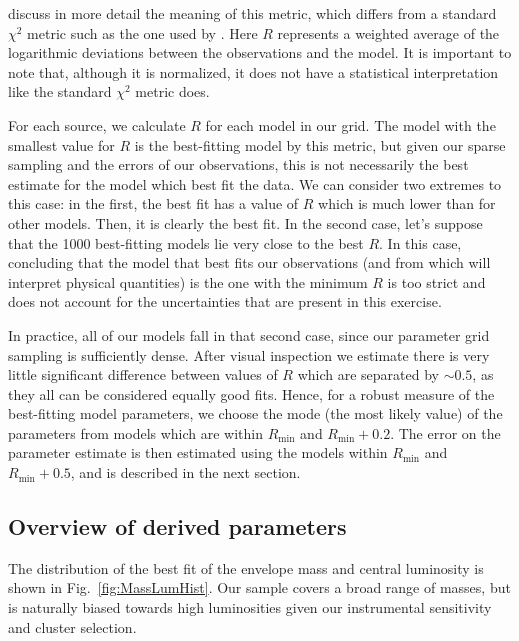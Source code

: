 \citet{Furlan:2016df} discuss in more detail the meaning of this metric, which differs from a standard $\chi^2$ metric such as the one used by \citet{Robitaille:2007dl}. Here $R$ represents a weighted average of the logarithmic deviations between the observations and the model. It is important to note that, although it is normalized, it does not have a statistical interpretation like the standard $\chi^2$ metric does. 

For each source, we calculate $R$ for each model in our grid. The model with the smallest value for $R$ is the best-fitting model by this metric, but given our sparse sampling and the errors of our observations, this is not necessarily the best estimate for the model which best fit the data. We can consider two extremes to this case: in the first, the best fit has a value of $R$ which is much lower than for other models. Then, it is clearly the best fit. In the second case, let's suppose that the 1000 best-fitting models lie very close to the best $R$. In this case, concluding that the model that best fits our observations (and from which will interpret physical quantities) is the one with the minimum $R$ is too strict and does not account for the uncertainties that are present in this exercise. 

In practice, all of our models fall in that second case, since our parameter grid sampling is sufficiently dense. After visual inspection we estimate there is very little significant difference between values of $R$ which are separated by $\sim 0.5$, as they all can be considered equally good fits. Hence, for a robust measure of the best-fitting model parameters, we choose the mode (the most likely value) of the parameters from models which are within $R_\textrm{min}$ and $R_\textrm{min}+0.2$. The error on the parameter estimate is then estimated using the models within $R_\textrm{min}$ and $R_\textrm{min}+0.5$, and is described in the next section.

\subsection{Overview of derived parameters}

The distribution of the best fit of the envelope mass and central luminosity is shown in Fig.~\ref{fig:MassLumHist}. Our sample covers a broad range of masses, but is naturally biased towards high luminosities given our instrumental sensitivity and cluster selection.


